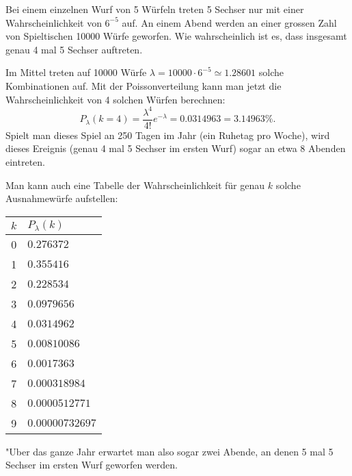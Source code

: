 Bei einem einzelnen Wurf von 5 Würfeln treten 5 Sechser nur mit
einer Wahrscheinlichkeit von $6^{-5}$ auf. An einem Abend werden
an einer grossen Zahl von Spieltischen 10000 Würfe geworfen.
Wie wahrscheinlich ist es, dass insgesamt genau 4 mal 5 Sechser
auftreten.

\begin{loesung}
Im Mittel treten auf 10000 Würfe $\lambda=10000\cdot 6^{-5}\simeq 1.28601$
solche
Kombinationen auf. Mit der Poissonverteilung kann man jetzt die
Wahrscheinlichkeit von 4 solchen Würfen berechnen:
\[
P_\lambda(k=4)=\frac{\lambda^4}{4!}e^{-\lambda}
=
0.0314963=3.14963\%.
\]
Spielt man dieses Spiel an 250 Tagen im Jahr (ein Ruhetag pro Woche),
wird dieses Ereignis (genau 4 mal 5 Sechser im ersten Wurf) sogar
an etwa 8 Abenden eintreten.

Man kann auch eine Tabelle
der Wahrscheinlichkeit für genau $k$ solche Ausnahmewürfe aufstellen:
\begin{center}
\begin{tabular}{|c|l|}
\hline
$k$&$P_\lambda(k)$\\
\hline
0&$0.276372$\\
1&$0.355416$\\
2&$0.228534$\\
3&$0.0979656$\\
4&$0.0314962$\\
5&$0.00810086$\\
6&$0.0017363$\\
7&$0.000318984$\\
8&$0.0000512771$\\
9&$0.00000732697$\\
\hline
\end{tabular}
\end{center}
"Uber das ganze Jahr erwartet man also sogar zwei Abende,
an denen 5 mal 5 Sechser im ersten Wurf geworfen werden.
\end{loesung}

